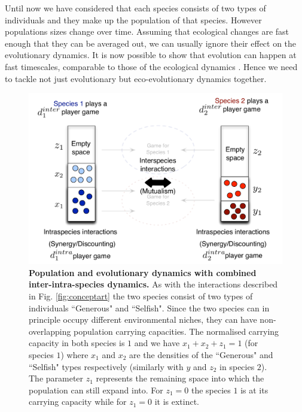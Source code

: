 \documentclass[12pt]{article}
\begin{document}
Until now we have considered that each species consists of two types of individuals and they make up the population of that species.
However populations sizes change over time. 
Assuming that ecological changes are fast enough that they can be averaged out, we can usually ignore their effect on the evolutionary dynamics.
It is now possible to show that evolution can happen at fast timescales, comparable to those of the ecological dynamics \citep{post:PTRSB:2009,beaumont:Nature:2009,hanski:PNAS:2011,sanchez:PLoSB:2013}.
Hence we need to tackle not just evolutionary but eco-evolutionary dynamics together.
%
\begin{figure}
\begin{center}
\includegraphics[scale=0.5]{Figures/popdyninterintra.pdf}
\caption{\small{
\textbf{Population and evolutionary dynamics with combined inter-intra-species dynamics.}
As with the interactions described in Fig. \ref{fig:conceptart} the two species consist of two types of individuals ``Generous" and ``Selfish".
Since the two species can in principle occupy different environmental niches, they  can have non-overlapping population carrying capacities.
The normalised carrying capacity in both species is $1$ and we have $x_1 + x_2 + z_1 = 1$ (for species $1$) where $x_1$ and $x_2$ are the densities of the ``Generous" and ``Selfish" types respectively (similarly with $y$ and $z_2$ in species $2$). 
The parameter $z_1$ represents the remaining space into which the population can still expand into.
For $z_1 = 0$ the species $1$ is at its carrying capacity while for $z_1 = 0$ it is extinct.}
\label{fig:conceptartpopdyn}
}
\end{center}
\end{figure}
%
\end{document}
